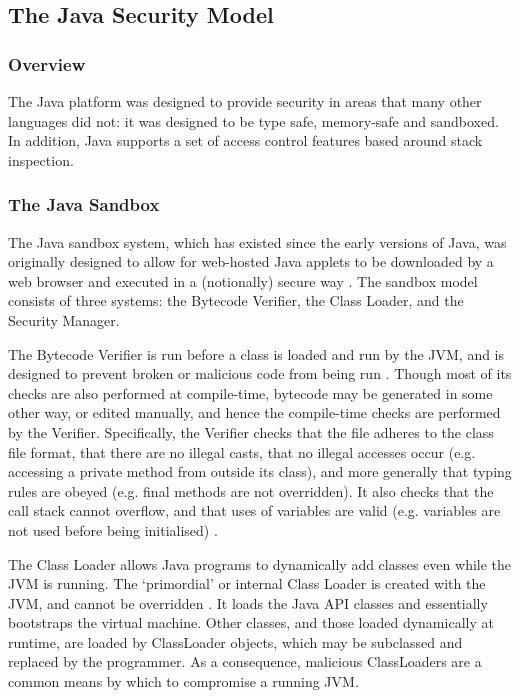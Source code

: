 \subsection{The Java Security Model}

\subsubsection{Overview}

The Java platform was designed to provide security in areas that many other languages did not: it was designed to be type safe, memory-safe and sandboxed. In addition, Java supports a set of access control features based around stack inspection.

\subsubsection{The Java Sandbox}

The Java sandbox system, which has existed since the early versions of Java, was originally designed to allow for web-hosted Java applets to be downloaded by a web browser and executed in a (notionally) secure way \cite{mcgraw1999securingjava}. The sandbox model consists of three systems: the Bytecode Verifier, the Class Loader, and the Security Manager.

The Bytecode Verifier is run before a class is loaded and run by the JVM, and is designed to prevent broken or malicious code from being run \cite{mcgraw1999securingjava}. Though most of its checks are also performed at compile-time, bytecode may be generated in some other way, or edited manually, and hence the compile-time checks are performed by the Verifier. Specifically, the Verifier checks that the file adheres to the class file format, that there are no illegal casts, that no illegal accesses occur (e.g. accessing a private method from outside its class), and more generally that typing rules are obeyed (e.g. final methods are not overridden). It also checks that the call stack cannot overflow, and that uses of variables are valid (e.g. variables are not used before being initialised) \cite{lindholm2014java}.

The Class Loader allows Java programs to dynamically add classes even while the JVM is running. The `primordial' or internal Class Loader is created with the JVM, and cannot be overridden \cite{mcgraw1999securingjava}. It loads the Java API classes and essentially bootstraps the virtual machine. Other classes, and those loaded dynamically at runtime, are loaded by ClassLoader objects, which may be subclassed and replaced by the programmer. As a consequence, malicious ClassLoaders are a common means by which to compromise a running JVM.

